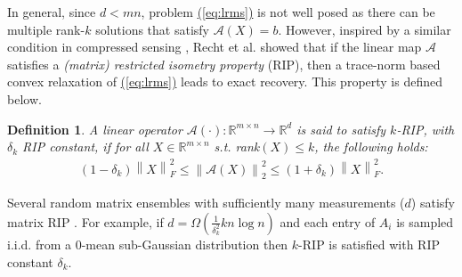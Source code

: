 \documentclass[11pt]{article}
\renewcommand{\eqref}[1]{\hyperref[#1]{(\ref*{#1})}}
\theoremstyle{plain}
\newtheorem{definition}[theorem]{Definition}
\theoremstyle{definition}
\newcommand{\rmn}{\mathbb{R}^{m \times n}}
\newcommand{\calA}{\mathcal{A}}
\newcommand{\aff}{{\mathcal A}}
\newcommand{\ase}{AltMinSense}
\begin{document}
In general, since $d<mn$, problem \eqref{eq:lrms} is not well posed as there can be multiple rank-$k$ solutions that satisfy $\calA(X)=b$. However, inspired by a similar condition in compressed sensing \cite{CandesT2005}%
, Recht et al. \cite{RechtFP2007} showed that if the linear map $\aff$ satisfies a {\em (matrix) restricted isometry property} (RIP), then a trace-norm based convex relaxation of \eqref{eq:lrms} leads to exact recovery. This property is defined below. 
\begin{definition}\cite{RechtFP2007}\label{defn:rip}
A linear operator $\aff(\cdot):\rmn\rightarrow \mathbb{R}^d$ is said to satisfy $k$-RIP, with $\delta_{k}$ RIP constant, if for all $X\in \rmn$ s.t. rank$(X)\leq k$, the following holds:
\begin{align}\label{eqn:sensing-2k-RIP1}
(1-\delta_k) \left\|X\right\|_F^2 \leq \left\|\calA(X)\right\|_2^2 \leq (1+\delta_k) \left\|X\right\|_F^2.
\end{align}
\end{definition}
Several random matrix ensembles with sufficiently many measurements ($d$) satisfy  matrix RIP \cite{RechtFP2007}. For example, if $d=\Omega(\frac{1}{\delta_k^2}kn\log n)$ and each entry of $A_i$ is sampled i.i.d. from a $0$-mean sub-Gaussian distribution then $k$-RIP is satisfied with RIP constant  $\delta_k$. 
\end{document}
